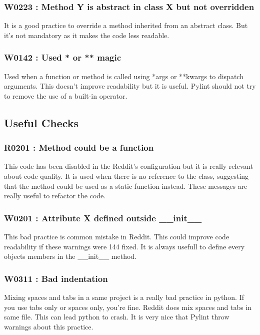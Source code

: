 \documentclass[12pt, a4paper]{article}
\newcommand{\pyl}{\textsf{Pylint}}
\begin{document}
\subsubsection*{W0223 : Method Y is abstract in class X but not overridden}

It is a good practice to override a method inherited from an abstract class. 
But it's not mandatory as it makes the code less readable.

\subsubsection*{W0142 : Used * or ** magic}

Used when a function or method is called using *args or **kwargs to dispatch arguments. 
This doesn't improve readability but it is useful.
\pyl{} should not try to remove the use of a built-in operator.

\newpage
\subsection*{Useful Checks}

\subsubsection*{R0201 : Method could be a function}

This code has been disabled in the Reddit's configuration but it is really relevant about code quality. 
It is used when there is no reference to the class, suggesting that the method could be used as a static function instead.
These messages are really useful to refactor the code.

\subsubsection*{W0201 : Attribute X defined outside \_\_init\_\_}

This bad practice is common mistake in Reddit.
This could improve code readability if these warnings were 144 fixed.
It is always usefull to define every objects members in the \_\_init\_\_ method.

\subsubsection*{W0311 : Bad indentation}

Mixing spaces and tabs in a same project is a really bad practice in python.
If you use tabs only or spaces only, you're fine.
Reddit does mix spaces and tabs in same file. 
This can lead python to crash.
It is very nice that \pyl{} throw warnings about this practice.
\end{document}
